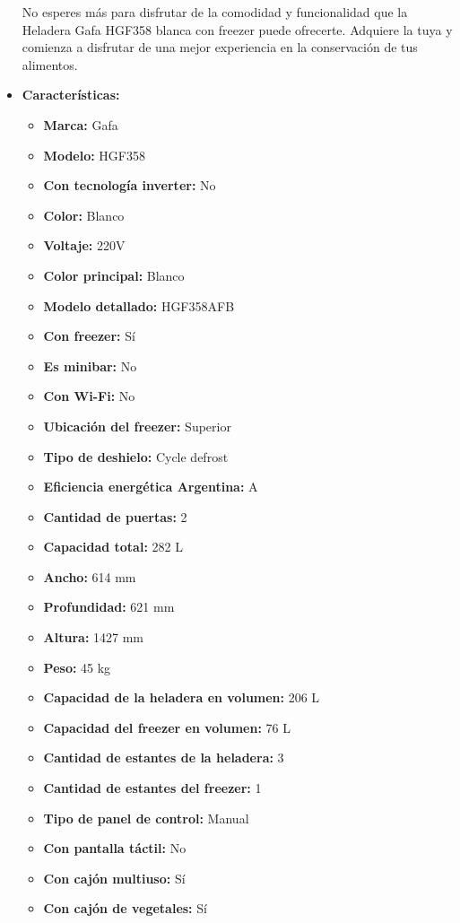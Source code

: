 \documentclass{article}
\begin{document}
\begin{adjustwidth}{2em}{}
\begin{itemize}
No esperes más para disfrutar de la comodidad y funcionalidad que la Heladera Gafa HGF358 blanca con freezer puede ofrecerte. Adquiere la tuya y comienza a disfrutar de una mejor experiencia en la conservación de tus alimentos.
    \item \textbf{Características:} 
    \begin{itemize}
        \item \textbf {Marca:} Gafa
    \item \textbf {Modelo:} HGF358
    \item \textbf {Con tecnología inverter:} No
    \item \textbf {Color:} Blanco
    \item \textbf {Voltaje:} 220V
    \item \textbf {Color principal:} Blanco
    \item \textbf {Modelo detallado:} HGF358AFB
    \item \textbf {Con freezer:} Sí
    \item \textbf {Es minibar:} No
    \item \textbf {Con Wi-Fi:} No
    \item \textbf {Ubicación del freezer:} Superior
    \item \textbf {Tipo de deshielo:} Cycle defrost
    \item \textbf {Eficiencia energética Argentina:} A
    \item \textbf {Cantidad de puertas:} 2
    \item \textbf {Capacidad total:} 282 L
    \item \textbf {Ancho:} 614 mm
    \item \textbf {Profundidad:} 621 mm
    \item \textbf {Altura:} 1427 mm
    \item \textbf {Peso:} 45 kg
    \item \textbf {Capacidad de la heladera en volumen:} 206 L
    \item \textbf {Capacidad del freezer en volumen:} 76 L
    \item \textbf {Cantidad de estantes de la heladera:} 3
    \item \textbf {Cantidad de estantes del freezer:} 1
    \item \textbf {Tipo de panel de control:} Manual
    \item \textbf {Con pantalla táctil:} No
    \item \textbf {Con cajón multiuso:} Sí
    \item \textbf {Con cajón de vegetales:} Sí

\end{itemize}
\end{itemize}
\end{adjustwidth}
\end{document}
